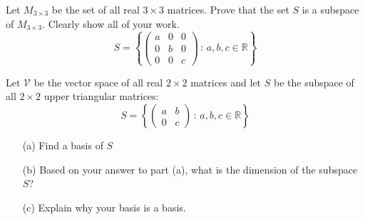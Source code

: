 \begin{problem}
        Let $M_{3 \times 3}$ be the set of all real $3 \times 3$ matrices.
        Prove that the set $S$ is a subspace of $M_{3
        \times 3}$. Clearly show all of your work.
        \[ S = \left\{ \begin{pmatrix} a & 0 & 0 \\ 0 & b & 0 \\ 0 & 0 & c \end{pmatrix}
        \, : \, a,b,c \in \mathbb{R} \right\} \]
\end{problem}

\begin{problem}
        Let $\mathcal{V}$ be the vector space of all real $2 \times 2$
        matrices and let $S$ be the subspace of all $2 \times 2$ upper triangular matrices:
    \[ S = \left\{ \begin{pmatrix} a & b \\ 0 & c \end{pmatrix} \, : \, a,b,c \in
            \mathbb{R} \right\} \]
            \begin{enumerate}
                \item[(a)] Find a basis of $S$
                \solution{
                \[ \mathcal{B} = \left\{ \begin{pmatrix} 1 & 0 \\ 0 & 0 \end{pmatrix} ,
                    \begin{pmatrix} 0 & 1 \\ 0 & 0 \end{pmatrix} ,\begin{pmatrix} 0 & 0 \\
                    0 & 1 \end{pmatrix} \right\} \]
                }
        \item[(b)] Based on your answer to part (a), what is the dimension of the
            subspace $S$?
            \solution{
                \[ dim(S) = 3 \]
            }
        \item[(c)] Explain why your basis is a basis.
        \end{enumerate}

\end{problem}


